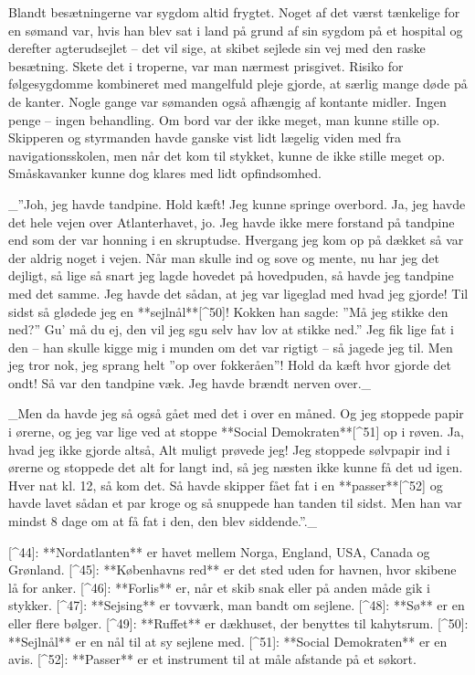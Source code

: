 \documentclass{book}
\begin{document}
Blandt besætningerne var sygdom altid frygtet. Noget af det værst tænkelige for en sømand
var, hvis han blev sat i land på grund af sin sygdom på et hospital og derefter
agterudsejlet – det vil sige, at skibet sejlede sin vej med den raske besætning. Skete det
i troperne, var man nærmest prisgivet. Risiko for følgesygdomme kombineret med mangelfuld
pleje gjorde, at særlig mange døde på de kanter. Nogle gange var sømanden også afhængig af
kontante midler. Ingen penge – ingen behandling. Om bord var der ikke meget, man kunne
stille op. Skipperen og styrmanden havde ganske vist lidt lægelig viden med fra
navigationsskolen, men når det kom til stykket, kunne de ikke stille meget op.
Småskavanker kunne dog klares med lidt opfindsomhed.

 _”Joh, jeg havde tandpine. Hold kæft! Jeg kunne springe overbord. Ja, jeg havde det hele
vejen over Atlanterhavet, jo. Jeg havde ikke mere forstand på tandpine end som der var
honning i en skruptudse. Hvergang jeg kom op på dækket så var der aldrig noget i vejen.
Når man skulle ind og sove og mente, nu har jeg det dejligt, så lige så snart jeg lagde
hovedet på hovedpuden, så havde jeg tandpine med det samme. Jeg havde det sådan, at jeg
var ligeglad med hvad jeg gjorde! Til sidst så glødede jeg en **sejlnål**[^50]! Kokken han sagde:
”Må jeg stikke den ned?” Gu’ må du ej, den vil jeg sgu selv hav lov at stikke ned.” Jeg
fik lige fat i den – han skulle kigge mig i munden om det var rigtigt – så jagede jeg til.
Men jeg tror nok, jeg sprang helt ”op over fokkeråen”! Hold da kæft hvor gjorde det ondt!
Så var den tandpine væk. Jeg havde brændt nerven over._

 _Men da havde jeg så også gået med det i over en måned. Og jeg stoppede papir i ørerne, og
jeg var lige ved at stoppe **Social Demokraten**[^51] op i r\o ven. Ja, hvad jeg ikke gjorde altså, Alt
muligt prøvede jeg! Jeg stoppede sølvpapir ind i ørerne og stoppede det alt for langt ind,
så jeg næsten ikke kunne få det ud igen. Hver nat kl. 12, så kom det. Så havde skipper
fået fat i en **passer**[^52] og havde lavet sådan et par kroge og så snuppede han tanden til
sidst. Men han var mindst 8 dage om at få fat i den, den blev siddende.”._

[^44]: **Nordatlanten** er havet mellem Norga, England, USA, Canada og
  Grønland.
[^45]: **Københavns red** er det sted uden for havnen, hvor skibene lå for
  anker.
[^46]: **Forlis** er, når et skib snak eller på anden måde gik i stykker.
[^47]: **Sejsing** er tovværk, man bandt om sejlene.
[^48]: **Sø** er en eller flere bølger.
[^49]: **Ruffet** er dækhuset, der benyttes til kahytsrum.
[^50]: **Sejlnål** er en nål til at sy sejlene med.
[^51]: **Social Demokraten** er en avis.
[^52]: **Passer** er et instrument til at måle afstande på et søkort.
\end{document}
